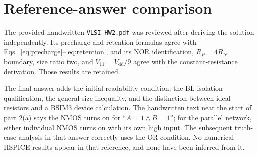 \documentclass[11pt,a4paper]{article}
\newcommand{\VDD}{V_{\mathrm{dd}}}
\begin{document}
\section*{Reference-answer comparison}
The provided handwritten \texttt{VLSI\_HW2.pdf} was reviewed after deriving
the solution independently. Its precharge and retention formulas agree
with Eqs.~\eqref{eq:precharge}--\eqref{eq:retention}, and its NOR identification,
$R_P=4R_N$ boundary, size ratio two, and $V_{11}=\VDD/9$ agree with the
constant-resistance derivation. Those results are retained.

The final answer adds the initial-readability condition, the BL isolation
qualification, the general size inequality, and the distinction between
ideal resistors and a BSIM3 device calculation. The handwritten text near
the start of part 2(a) says the NMOS turns on for ``$A=1\land B=1$'';
for the parallel network, either individual NMOS turns on with its own
high input. The subsequent truth-case analysis in that answer correctly
uses the OR condition. No numerical HSPICE results appear in that reference,
and none have been inferred from it.
\end{document}
